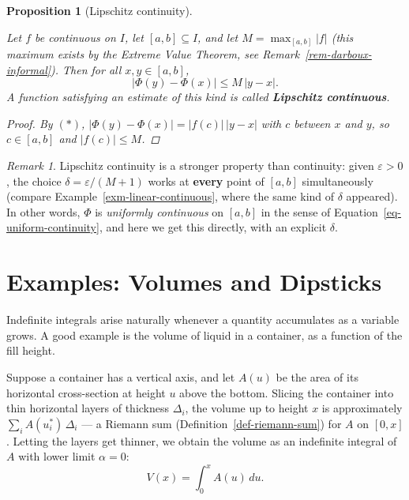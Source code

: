 \documentclass[
  letterpaper,
  DIV=11,
  numbers=noendperiod]{scrreprt}
\theoremstyle{plain}
\theoremstyle{plain}
\newtheorem{proposition}{Proposition}[chapter]
\theoremstyle{definition}
\theoremstyle{definition}
\theoremstyle{definition}
\theoremstyle{plain}
\theoremstyle{plain}
\theoremstyle{remark}
\newtheorem{refremark}{Remark}[chapter]
\begin{document}
\begin{proposition}[Lipschitz
continuity]\protect\hypertarget{prp-indefinite-integral-lipschitz}{}\label{prp-indefinite-integral-lipschitz}

Let \(f\) be continuous on \(I\), let \([a,b]\subseteq I\), and let
\(M = \max_{[a,b]}\lvert f \rvert\) (this maximum exists by the Extreme
Value Theorem, see Remark~\ref{rem-darboux-informal}). Then for all
\(x, y\in[a,b]\), \[
\lvert \Phi(y) - \Phi(x) \rvert \le M\,\lvert y-x \rvert.
\] A function satisfying an estimate of this kind is called
\textbf{Lipschitz continuous}.

\begin{proof}
By \((\ast)\),
\(\lvert \Phi(y)-\Phi(x) \rvert = \lvert f(c) \rvert\,\lvert y-x \rvert\)
with \(c\) between \(x\) and \(y\), so \(c\in[a,b]\) and
\(\lvert f(c) \rvert\le M\).
\end{proof}

\end{proposition}

\begin{refremark}
Lipschitz continuity is a stronger property than continuity: given
\(\varepsilon>0\), the choice \(\delta = \varepsilon/(M+1)\) works at
\textbf{every} point of \([a,b]\) simultaneously (compare
Example~\ref{exm-linear-continuous}, where the same kind of \(\delta\)
appeared). In other words, \(\Phi\) is \emph{uniformly continuous} on
\([a,b]\) in the sense of Equation~\ref{eq-uniform-continuity}, and here
we get this directly, with an explicit \(\delta\).

\label{rem-lipschitz-stronger}

\end{refremark}

\section{Examples: Volumes and
Dipsticks}\label{examples-volumes-and-dipsticks}

Indefinite integrals arise naturally whenever a quantity accumulates as
a variable grows. A good example is the volume of liquid in a container,
as a function of the fill height.

Suppose a container has a vertical axis, and let \(A(u)\) be the area of
its horizontal cross-section at height \(u\) above the bottom. Slicing
the container into thin horizontal layers of thickness \(\Delta_i\), the
volume up to height \(x\) is approximately \(\sum_i A(u_i^*)\,\Delta_i\)
--- a Riemann sum (Definition~\ref{def-riemann-sum}) for \(A\) on
\([0,x]\). Letting the layers get thinner, we obtain the volume as an
indefinite integral of \(A\) with lower limit \(\alpha = 0\): \[
V(x) = \int_0^x A(u)\,du.
\]
\end{document}
